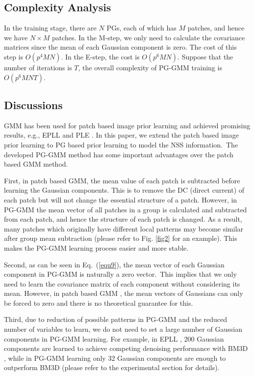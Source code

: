 \subsection{Complexity Analysis}
In the training stage, there are $N$ PGs, each of which has $M$ patches, and hence we have $N\times M$ patches. In the M-step, we only need to calculate the covariance matrices since the mean of each Gaussian component is zero. The cost of this step is $O(p^{4}MN)$. In the E-step, the cost is $O(p^{6}MN)$. Suppose that the number of iterations is $T$, the overall complexity of PG-GMM training is $O(p^{6}MNT)$.
\subsection{Discussions}
GMM has been used for patch based image prior learning and achieved promising results, e.g., EPLL \cite{epll} and PLE \cite{ple}. In this paper, we extend the patch based image prior learning to PG based prior learning to model the NSS information.\ The developed PG-GMM method has some important advantages over the patch based GMM method.

First, in patch based GMM, the mean value of each patch is subtracted before learning the Gaussian components. This is to remove the DC (direct current) of each patch but will not change the essential structure of a patch. However, in PG-GMM the mean vector of all patches in a group is calculated and subtracted from each patch, and hence the structure of each patch is changed. As a result, many patches which originally have different local patterns may become similar after group mean subtraction (please refer to Fig. \ref{fig2} for an example). This makes the PG-GMM learning process easier and more stable. 

Second, as can be seen in Eq.\ (\ref{equ9}), the mean vector of each Gaussian component in PG-GMM is naturally a zero vector.\ This implies that we only need to learn the covariance matrix of each component without considering its mean. However, in patch based GMM \cite{epll}, the mean vectors of Gaussians can only be forced to zero and there is no theoretical guarantee for this.

Third, due to reduction of possible patterns in PG-GMM and the reduced number of variables to learn, we do not need to set a large number of Gaussian components in PG-GMM learning. For example, in EPLL \cite{epll}, 200 Gaussian components are learned to achieve competing denoising performance with BM3D \cite{bm3d}, while in PG-GMM learning only 32 Gaussian components are enough to outperform BM3D (please refer to the experimental section for details).
